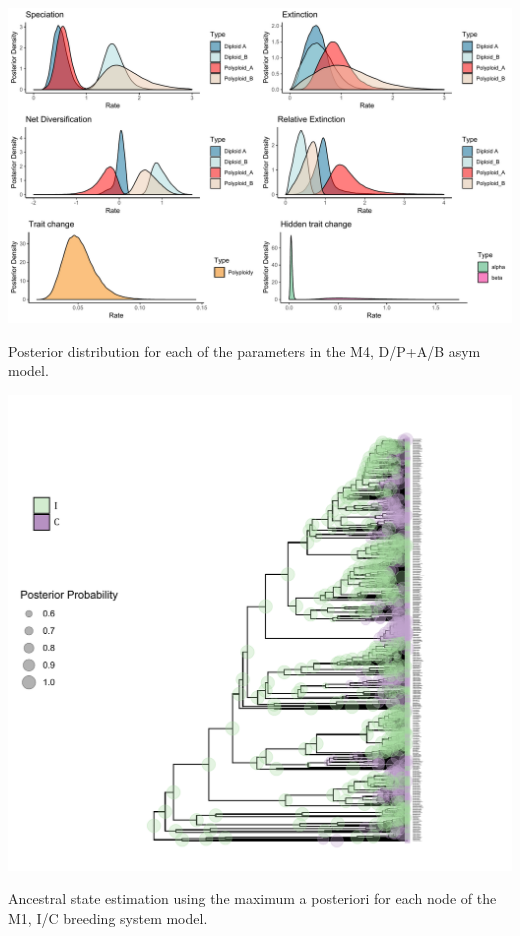 \begin{suppfigure}
\includegraphics[width=\textwidth]{hisseDPnodipasymposteriordist.pdf}
\caption{Posterior distribution for each of the parameters in the M4, D/P+A/B asym model.} %
\label{suppfigure:DPnodipAB}
\end{suppfigure}

\begin{suppfigure}
\includegraphics[width=\textwidth]{asrIC.pdf}
\caption{Ancestral state estimation using the maximum a posteriori for each node of the M1, I/C breeding system model.} %
\label{suppfigure:ICasr}
\end{suppfigure}


